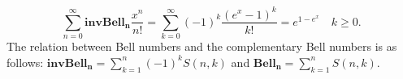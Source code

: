 \documentclass[pdflatex,sn-mathphys-num]{sn-jnl}%
\newtheorem{theorem}{Theorem}
\theoremstyle{thmstyleone}%
\theoremstyle{thmstyletwo}%
\theoremstyle{thmstylethree}%
\begin{document}
\[
 \sum_{n=0}^{\infty} \mathbf{invBell_n} \frac{x^n}{n!} =\sum_{k=0}^{\infty}(-1)^k\dfrac{(e^x - 1)^k}{k!}= e^{1-e^x} \quad k\geq 0.
\]
The relation between Bell numbers and the complementary Bell numbers is as follows:
$\mathbf{invBell_n}=\sum_{k=1}^{n} (-1)^kS(n,k) $ and $\mathbf{Bell_n}=\sum_{k=1}^{n} S(n,k). $








  
\end{document}
